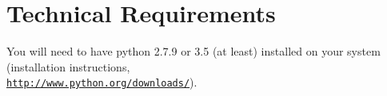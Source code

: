 \section{Technical Requirements}

You will need to have python 2.7.9 or 3.5 (at least) installed on your system (installation instructions, \\ \texttt{\url{http://www.python.org/downloads/}}).
